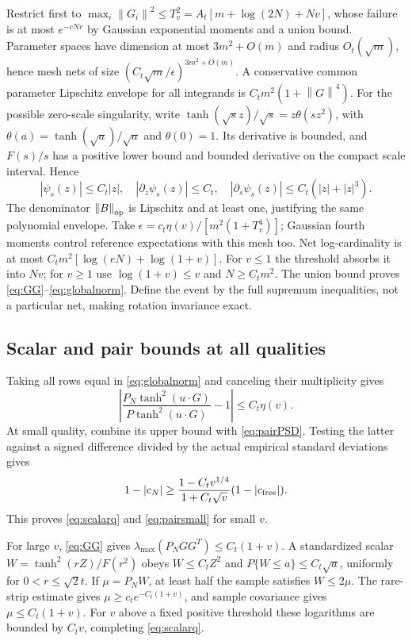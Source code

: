 \documentclass[11pt]{article}
\newcommand{\norm}[1]{\left\lVert#1\right\rVert}
\begin{document}
Restrict first to $\max_i\norm{G_i}^2\le T_v^2=A_t[m+\log(2N)+Nv]$, whose failure is at most $e^{-cNv}$ by Gaussian exponential moments and a union bound. Parameter spaces have dimension at most $3m^2+O(m)$ and radius $O_t(\sqrt m)$, hence mesh nets of size $(C_t\sqrt m/\epsilon)^{3m^2+O(m)}$. A conservative common parameter Lipschitz envelope for all integrands is $C_tm^2(1+\norm G^4)$.
For the possible zero-scale singularity, write $\tanh(\sqrt s z)/\sqrt s=z\theta(sz^2)$, with $\theta(a)=\tanh(\sqrt a)/\sqrt a$ and $\theta(0)=1$. Its derivative is bounded, and $F(s)/s$ has a positive lower bound and bounded derivative on the compact scale interval. Hence
\[
 |\psi_s(z)|\le C_t|z|,\quad |\partial_z\psi_s(z)|\le C_t,
 \quad |\partial_s\psi_s(z)|\le C_t(|z|+|z|^3).
\]
The denominator $\norm B_{\op}$ is Lipschitz and at least one, justifying the same polynomial envelope. Take $\epsilon=c_t\eta(v)/[m^2(1+T_v^4)]$; Gaussian fourth moments control reference expectations with this mesh too. Net log-cardinality is at most $C_tm^2[\log(eN)+\log(1+v)]$. For $v\le1$ the threshold absorbs it into $Nv$; for $v\ge1$ use $\log(1+v)\le v$ and $N\ge C_tm^2$. The union bound proves \eqref{eq:GG}--\eqref{eq:globalnorm}. Define the event by the full supremum inequalities, not a particular net, making rotation invariance exact.

\subsection{Scalar and pair bounds at all qualities}
Taking all rows equal in \eqref{eq:globalnorm} and canceling their multiplicity gives
\begin{equation}\label{eq:scalarraw}
 \left|\frac{P_N\tanh^2(u\cdot G)}{P\tanh^2(u\cdot G)}-1\right|\le C_t\eta(v).
\end{equation}
At small quality, combine its upper bound with \eqref{eq:pairPSD}. Testing the latter against a signed difference divided by the actual empirical standard deviations gives
\[
 1-|c_N|\ge\frac{1-C_tv^{1/4}}{1+C_t\sqrt v}(1-|c_{\rm free}|).
\]
This proves \eqref{eq:scalarq} and \eqref{eq:pairsmall} for small $v$.

For large $v$, \eqref{eq:GG} gives $\lambda_{\max}(P_NGG^T)\le C_t(1+v)$. A standardized scalar $W=\tanh^2(rZ)/F(r^2)$ obeys $W\le C_tZ^2$ and $P\{W\le a\}\le C_t\sqrt a$, uniformly for $0<r\le\sqrt2t$. If $\mu=P_NW$, at least half the sample satisfies $W\le2\mu$. The rare-strip estimate gives $\mu\ge c_te^{-C_t(1+v)}$, and sample covariance gives $\mu\le C_t(1+v)$. For $v$ above a fixed positive threshold these logarithms are bounded by $C_tv$, completing \eqref{eq:scalarq}.
\end{document}
